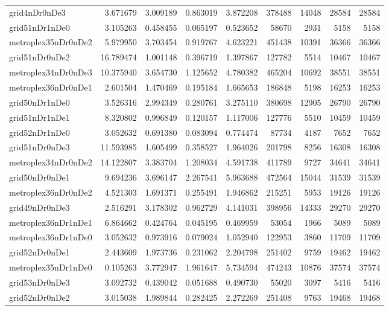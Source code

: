 \documentclass[../../../thesis.tex]{subfiles}
\begin{document}
\begin{longtable}{|l|r|r|r|r|r|r|r|r|}
grid4nDr0nDe3 & 3.671679 & 3.009189 & 0.863019 & 3.872208 & 378488 & 14048 & 28584 & 28584 \\
grid51nDr1nDe0 & 3.105263 & 0.458455 & 0.065197 & 0.523652 & 58670 & 2931 & 5158 & 5158 \\
metroplex35nDr0nDe2 & 5.979950 & 3.703454 & 0.919767 & 4.623221 & 451438 & 10391 & 36366 & 36366 \\
grid51nDr0nDe2 & 16.789474 & 1.001148 & 0.396719 & 1.397867 & 127782 & 5514 & 10467 & 10467 \\
metroplex34nDr0nDe3 & 10.375940 & 3.654730 & 1.125652 & 4.780382 & 465204 & 10692 & 38551 & 38551 \\
metroplex36nDr0nDe1 & 2.601504 & 1.470469 & 0.195184 & 1.665653 & 186848 & 5198 & 16253 & 16253 \\
grid50nDr1nDe0 & 3.526316 & 2.994349 & 0.280761 & 3.275110 & 380698 & 12905 & 26790 & 26790 \\
grid51nDr1nDe1 & 8.320802 & 0.996849 & 0.120157 & 1.117006 & 127776 & 5510 & 10459 & 10459 \\
grid52nDr1nDe0 & 3.052632 & 0.691380 & 0.083094 & 0.774474 & 87734 & 4187 & 7652 & 7652 \\
grid51nDr0nDe3 & 11.593985 & 1.605499 & 0.358527 & 1.964026 & 201798 & 8256 & 16308 & 16308 \\
metroplex34nDr0nDe2 & 14.122807 & 3.383704 & 1.208034 & 4.591738 & 411789 & 9727 & 34641 & 34641 \\
grid50nDr0nDe1 & 9.694236 & 3.696147 & 2.267541 & 5.963688 & 472564 & 15044 & 31539 & 31539 \\
metroplex36nDr0nDe2 & 4.521303 & 1.691371 & 0.255491 & 1.946862 & 215251 & 5953 & 19126 & 19126 \\
grid49nDr0nDe3 & 2.516291 & 3.178302 & 0.962729 & 4.141031 & 398956 & 14333 & 29270 & 29270 \\
metroplex36nDr1nDe1 & 6.864662 & 0.424764 & 0.045195 & 0.469959 & 53054 & 1966 & 5089 & 5089 \\
metroplex36nDr1nDe0 & 3.052632 & 0.973916 & 0.079024 & 1.052940 & 122953 & 3860 & 11709 & 11709 \\
grid52nDr0nDe1 & 2.443609 & 1.973736 & 0.231062 & 2.204798 & 251402 & 9759 & 19462 & 19462 \\
metroplex35nDr1nDe0 & 0.105263 & 3.772947 & 1.961647 & 5.734594 & 474243 & 10876 & 37574 & 37574 \\
grid53nDr0nDe3 & 3.092732 & 0.439042 & 0.051688 & 0.490730 & 55020 & 3097 & 5416 & 5416 \\
grid52nDr0nDe2 & 3.015038 & 1.989844 & 0.282425 & 2.272269 & 251408 & 9763 & 19468 & 19468 \\

\end{longtable}
\end{document}
